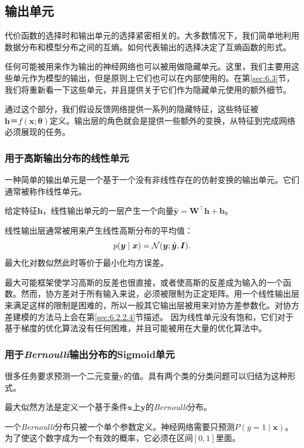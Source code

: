 \subsection{输出单元}
\label{sec:6.2.2}

代价函数的选择时和输出单元的选择紧密相关的。大多数情况下，我们简单地利用数据分布和模型分布之间的互熵。如何代表输出的选择决定了互熵函数的形式。

任何可能被用来作为输出的神经网络也可以被用做隐藏单元。这里，我们主要用这些单元作为模型的输出，但是原则上它们也可以在内部使用的。在第\ref{sec:6.3}节，我们将重新看一下这些单元，并且提供关于它们作为隐藏单元使用的额外细节。

通过这个部分，我们假设反馈网络提供一系列的隐藏特征，这些特征被$\bm{h}＝f(\bm{x};\bm{\theta})$定义。输出层的角色就会是提供一些额外的变换，从特征到完成网络必须展现的任务。
 
\subsubsection{用于高斯输出分布的线性单元}
\label{sec:6.2.2.1}
一种简单的输出单元是一个基于一个没有非线性存在的仿射变换的输出单元。它们通常被称作线性单元。

给定特征$\bm{h}$，线性输出单元的一层产生一个向量$\hat{\bm{y}}=\bm{W}^\top \bm{h} + \bm{b}$。

线性输出层通常被用来产生线性高斯分布的平均值：
\begin{equation}
p(\bm{y}\mid\bm{x}) = \mathcal{N}(\bm{y}; \hat{\bm{y}}, \bm{I} ).
\end{equation} 
最大化对数似然此时等价于最小化均方误差。

最大可能框架使学习高斯的反差也很直接，或者使高斯的反差成为输入的一个函数。然而，协方差对于所有输入来说，必须被限制为正定矩阵。用一个线性输出层来满足这样的限制是困难的，所以一般其它输出层被用来对协方差参数化。对协方差建模的方法马上会在第\ref{sec:6.2.2.4}节描述。
因为线性单元没有饱和，它们对于基于梯度的优化算法没有任何困难，并且可能被用在大量的优化算法中。
 
\subsubsection{用于\emph{Bernoulli}输出分布的Sigmoid单元}
\label{sec:6.2.2.2}
很多任务要求预测一个二元变量y的值。具有两个类的分类问题可以归结为这种形式。

最大似然方法是定义一个基于条件$\bm{x}$上$\bm{y}$的\emph{Bernoulli}分布。

一个\emph{Bernoulli}分布只被一个单个参数定义。神经网络需要只预测$P(y=1 \mid \bm{x})$。为了使这个数字成为一个有效的概率，它必须在区间$[0,1]$里面。

